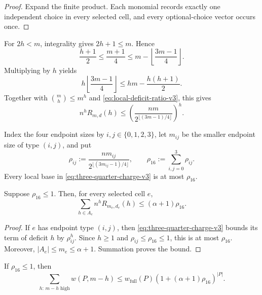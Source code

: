 \begin{proof}
Expand the finite product. Each monomial records exactly one independent choice
in every selected cell, and every optional-choice vector occurs once.
\end{proof}

For $2h<m$, integrality gives $2h+1\le m$. Hence
\[
  \frac{h+1}{2}
  \le
  \frac{m+1}{4}
  \le
  m-\left\lfloor\frac{3m-1}{4}\right\rfloor.
\]
Multiplying by $h$ yields
\begin{equation}
  h\left\lfloor\frac{3m-1}{4}\right\rfloor
  \le
  hm-\frac{h(h+1)}2.
  \label{eq:three-quarter-budget-v3}
\end{equation}
Together with $\binom mh\le m^h$ and
\eqref{eq:local-deficit-ratio-v3}, this gives
\begin{equation}
  n^hR_{m,d}(h)
  \le
  \left(
    \frac{nm}{2^{\lfloor(3m-1)/4\rfloor}}
  \right)^h.
  \label{eq:three-quarter-charge-v3}
\end{equation}

Index the four endpoint sizes by $i,j\in\{0,1,2,3\}$, let $m_{ij}$ be the
smaller endpoint size of type $(i,j)$, and put
\[
  \rho_{ij}
  :=
  \frac{n m_{ij}}{2^{\lfloor(3m_{ij}-1)/4\rfloor}},
  \qquad
  \rho_{16}:=\sum_{i,j=0}^{3}\rho_{ij}.
\]
Every local base in \eqref{eq:three-quarter-charge-v3} is at most
$\rho_{16}$.

\begin{lemma}
\label{lem:coarse-local-deficit-sum-v3}
Suppose $\rho_{16}\le1$. Then, for every selected cell $e$,
\[
  \sum_{h\in A_e}n^hR_{m_e,d_e}(h)
  \le
  (\alpha+1)\rho_{16}.
\]
\end{lemma}

\begin{proof}
If $e$ has endpoint type $(i,j)$, then
\eqref{eq:three-quarter-charge-v3} bounds its term of deficit $h$ by
$\rho_{ij}^h$. Since $h\ge1$ and
$\rho_{ij}\le\rho_{16}\le1$, this is at most $\rho_{16}$. Moreover,
$|A_e|\le m_e\le\alpha+1$. Summation proves the bound.
\end{proof}

\begin{proposition}
\label{prop:fixed-support-all-deficit-v3}
If $\rho_{16}\le1$, then
\begin{equation}
  \sum_{h:\,m-h\text{ high}}w(P,m-h)
  \le
  w_{\mathrm{full}}(P)
  \left(1+(\alpha+1)\rho_{16}\right)^{|P|}.
  \label{eq:fixed-support-all-deficit-v3}
\end{equation}
\end{proposition}

